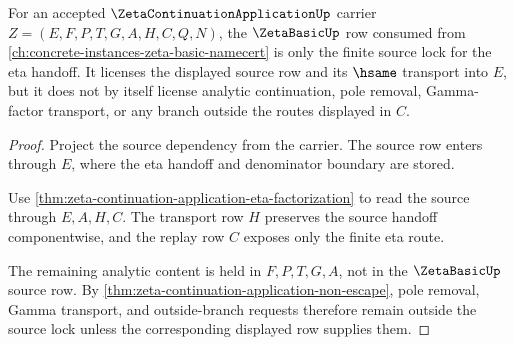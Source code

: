 \begin{theorem}
\label{thm:zeta-continuation-application-zeta-basic-source-lock}
For an accepted $\ZetaContinuationApplicationUp$ carrier $Z=(E,F,P,T,G,A,H,C,Q,N)$, the $\ZetaBasicUp$ row consumed from \autoref{ch:concrete-instances-zeta-basic-namecert} is only the finite source lock for the eta handoff. It licenses the displayed source row and its $\hsame$ transport into $E$, but it does not by itself license analytic continuation, pole removal, Gamma-factor transport, or any branch outside the routes displayed in $C$.
\end{theorem}
\begin{proof}
Project the source dependency from the carrier. The source row enters through $E$, where the eta handoff and denominator boundary are stored.

Use \autoref{thm:zeta-continuation-application-eta-factorization} to read the source through $E,A,H,C$. The transport row $H$ preserves the source handoff componentwise, and the replay row $C$ exposes only the finite eta route.

The remaining analytic content is held in $F,P,T,G,A$, not in the $\ZetaBasicUp$ source row. By \autoref{thm:zeta-continuation-application-non-escape}, pole removal, Gamma transport, and outside-branch requests therefore remain outside the source lock unless the corresponding displayed row supplies them.
\end{proof}

